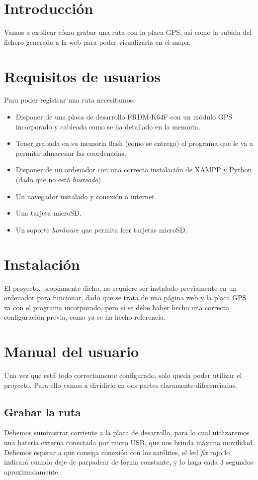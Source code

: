 
\section{Introducción}
Vamos a explicar cómo grabar una ruta con la placa GPS, así como la subida del fichero generado a la web para poder visualizarla en el mapa.
\section{Requisitos de usuarios}
Para poder registrar una ruta necesitamos:
\begin{itemize}
	\item
	Disponer de una placa de desarrollo FRDM-K64F con un módulo GPS incorporado y cableado como se ha detallado en la memoria.
    \item
    Tener grabada en su memoria flash (como se entrega) el programa que le va a permitir almacenar las coordenadas.
    \item
    Disponer de un ordenador con una correcta instalación de XAMPP y Python (dado que no está \textit{hosteada}).
    \item
    Un navegador instalado y conexión a internet.
    \item
    Una tarjeta microSD.
    \item
    Un soporte \textit{hardware} que permita leer tarjetas microSD.
\end{itemize}

\section{Instalación}
El proyecto, propiamente dicho, no requiere ser instalado previamente en un ordenador para funcionar, dado que se trata de una página web y la placa GPS va con el programa incorporado, pero sí se debe haber hecho una correcta configuración previa, como ya se ha hecho referencia. 

\section{Manual del usuario}
Una vez que está todo correctamente configurado, solo queda poder utilizar el proyecto. Para ello vamos a dividirlo en dos partes claramente diferenciadas.
\subsection{Grabar la ruta}
Debemos suministrar corriente a la placa de desarrollo, para lo cual utilizaremos una batería externa conectada por micro USB, que nos brinda máxima movilidad. Debemos esperar a que consiga conexión con los satélites, el led \textit{fix} rojo lo indicará cuando deje de parpadear de forma constante, y lo haga cada 3 segundos aproximadamente. 

